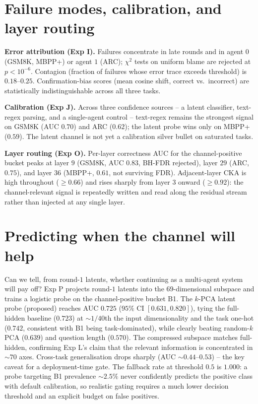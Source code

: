 \documentclass{article}
\begin{document}
\section{Failure modes, calibration, and layer routing}
\label{sec:failure}

\textbf{Error attribution (Exp I).} Failures concentrate in late rounds and in agent $0$ (GSM8K, MBPP+) or agent $1$ (ARC); $\chi^2$ tests on uniform blame are rejected at $p < 10^{-6}$. Contagion (fraction of failures whose error trace exceeds threshold) is $0.18$--$0.25$. Confirmation-bias scores (mean cosine shift, correct vs.\ incorrect) are statistically indistinguishable across all three tasks.

\textbf{Calibration (Exp J).} Across three confidence sources -- a latent classifier, text-regex parsing, and a single-agent control -- text-regex remains the strongest signal on GSM8K (AUC $0.70$) and ARC ($0.62$); the latent probe wins only on MBPP+ ($0.59$). The latent channel is not yet a calibration silver bullet on saturated tasks.

\textbf{Layer routing (Exp O).} Per-layer correctness AUC for the channel-positive bucket peaks at layer $9$ (GSM8K, AUC $0.83$, BH-FDR rejected), layer $29$ (ARC, $0.75$), and layer $36$ (MBPP+, $0.61$, not surviving FDR). Adjacent-layer CKA is high throughout ($\geq 0.66$) and rises sharply from layer $3$ onward ($\geq 0.92$): the channel-relevant signal is repeatedly written and read along the residual stream rather than injected at any single layer.

\section{Predicting when the channel will help}
\label{sec:probe}

Can we tell, from round-$1$ latents, whether continuing as a multi-agent system will pay off? Exp P projects round-$1$ latents into the $69$-dimensional subspace and trains a logistic probe on the channel-positive bucket B1. The $k$-PCA latent probe (proposed) reaches AUC $\mathbf{0.725}$ ($95\%$ CI $[0.631, 0.820]$), tying the full-hidden baseline ($0.723$) at $\sim 1/40$th the input dimensionality and the task one-hot ($0.742$, consistent with B1 being task-dominated), while clearly beating random-$k$ PCA ($0.639$) and question length ($0.570$). The compressed subspace matches full-hidden, confirming Exp L's claim that the relevant information is concentrated in $\sim 70$ axes. Cross-task generalisation drops sharply (AUC $\sim 0.44$--$0.53$) -- the key caveat for a deployment-time gate. The fallback rate at threshold $0.5$ is $1.000$: a probe targeting B1 prevalence $\sim 2.5\%$ never confidently predicts the positive class with default calibration, so realistic gating requires a much lower decision threshold and an explicit budget on false positives.
\end{document}
